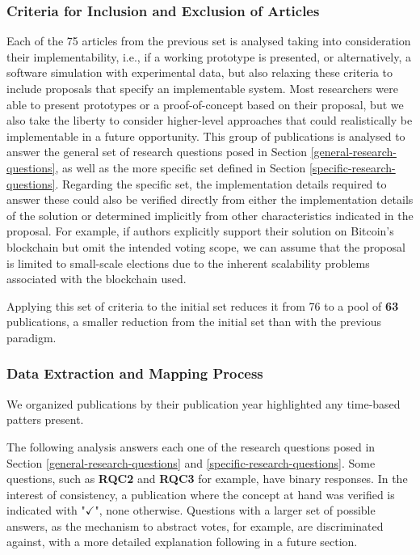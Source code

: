 \documentclass[../access.tex]{subfiles}
\begin{document}
\subsubsection{Criteria for Inclusion and Exclusion of Articles}
    Each of the 75 articles from the previous set is analysed taking into consideration their implementability, i.e., if a working prototype is presented, or alternatively, a software simulation with experimental data, but also relaxing these criteria to include proposals that specify an implementable system. Most researchers were able to present prototypes or a proof-of-concept based on their proposal, but we also take the liberty to consider higher-level approaches that could realistically be implementable in a future opportunity. This group of publications is analysed to answer the general set of research questions posed in Section \ref{general-research-questions}, as well as the more specific set defined in Section \ref{specific-research-questions}. Regarding the specific set, the implementation details required to answer these could also be verified directly from either the implementation details of the solution or determined implicitly from other characteristics indicated in the proposal. For example, if authors explicitly support their solution on Bitcoin's blockchain but omit the intended voting scope, we can assume that the proposal is limited to small-scale elections due to the inherent scalability problems associated with the blockchain used.
	\par
    Applying this set of criteria to the initial set reduces it from 76 to a pool of \textbf{63} publications, a smaller reduction from the initial set than with the previous paradigm.

\subsubsection{Data Extraction and Mapping Process}
    We organized publications by their publication year highlighted any time-based patters present.
	\par
    The following analysis answers each one of the research questions posed in Section \ref{general-research-questions} and \ref{specific-research-questions}. Some questions, such as \textbf{RQC2} and \textbf{RQC3} for example, have binary responses. In the interest of consistency, a publication where the concept at hand was verified is indicated with "$ \checkmark $", none otherwise. Questions with a larger set of possible answers, as the mechanism to abstract votes, for example, are discriminated against, with a more detailed explanation following in a future section.
\end{document}
